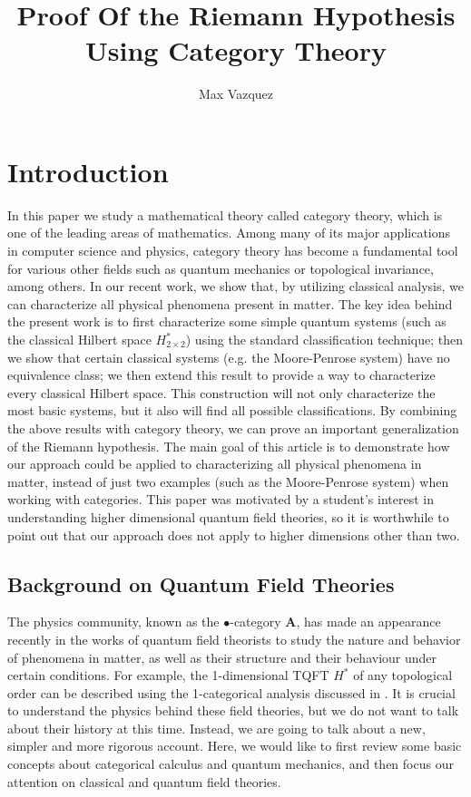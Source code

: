 \documentclass[a4paper,reqno,oneside]{article}
\begin{document}
\title{Proof Of the Riemann Hypothesis Using Category Theory}
\author{Max Vazquez}
\maketitle


\tableofcontents

\section*{Introduction}
In this paper we study a mathematical theory called category theory, which is one of the leading areas of mathematics. Among many of its major applications in computer science and physics, category theory has become a fundamental tool for various other fields such as quantum mechanics or topological invariance, among others. In our recent work, we show that, by utilizing classical analysis, we can characterize all physical phenomena present in matter. The key idea behind the present work is to first characterize some simple quantum systems (such as the classical Hilbert space $H^*_{2\times 2}$) using the standard classification technique; then we show that certain classical systems (e.g. the Moore-Penrose system) have no equivalence class; we then extend this result to provide a way to characterize every classical Hilbert space. This construction will not only characterize the most basic systems, but it also will find all possible classifications. By combining the above results with category theory, we can prove an important generalization of the Riemann hypothesis. The main goal of this article is to demonstrate how our approach could be applied to characterizing all physical phenomena in matter, instead of just two examples (such as the Moore-Penrose system) when working with categories. This paper was motivated by a student's interest in understanding higher dimensional quantum field theories, so it is worthwhile to point out that our approach does not apply to higher dimensions other than two.

\subsection{Background on Quantum Field Theories}
The physics community, known as the $\bullet$-category $\mathbf{A}$, has made an appearance recently in the works of quantum field theorists to study the nature and behavior of phenomena in matter, as well as their structure and their behaviour under certain conditions. For example, the 1-dimensional TQFT $H^*$ of any topological order can be described using the 1-categorical analysis discussed in \cite{Freed:2005,Freed:2007}. It is crucial to understand the physics behind these field theories, but we do not want to talk about their history at this time. Instead, we are going to talk about a new, simpler and more rigorous account. Here, we would like to first review some basic concepts about categorical calculus and quantum mechanics, and then focus our attention on classical and quantum field theories.
\end{document}
